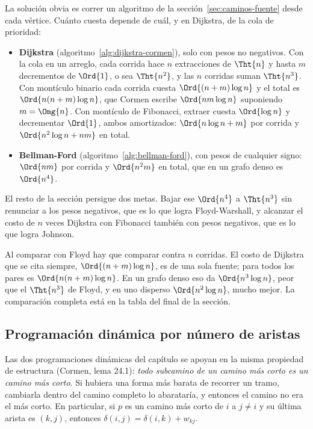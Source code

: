 \documentclass[11pt,letterpaper]{article}
\begin{document}
La solución obvia es correr un algoritmo de la
sección~\ref{sec:caminos-fuente} desde cada vértice. Cuánto cuesta
depende de cuál, y en Dijkstra, de la cola de prioridad:
\begin{itemize}[itemsep=0.1em]
  \item \textbf{Dijkstra} (algoritmo~\ref{alg:dijkstra-cormen}), solo
        con pesos no negativos. Con la cola en un arreglo, cada
        corrida hace $n$ extracciones de $\Tht{n}$ y hasta $m$
        decrementos de $\Ord{1}$, o sea $\Tht{n^2}$, y las $n$
        corridas suman $\Tht{n^3}$. Con montículo binario cada corrida
        cuesta $\Ord{(n + m)\log n}$ y el total es
        $\Ord{n(n + m)\log n}$, que Cormen escribe $\Ord{nm \log n}$
        suponiendo $m = \Omg{n}$. Con montículo de Fibonacci, extraer
        cuesta $\Ord{\log n}$ y decrementar $\Ord{1}$, ambos
        amortizados: $\Ord{n \log n + m}$ por corrida y
        $\Ord{n^2 \log n + nm}$ en total.
  \item \textbf{Bellman-Ford} (algoritmo~\ref{alg:bellman-ford}), con
        pesos de cualquier signo: $\Ord{nm}$ por corrida y
        $\Ord{n^2 m}$ en total, que en un grafo denso es $\Ord{n^4}$.
\end{itemize}
El resto de la sección persigue dos metas. Bajar ese $\Ord{n^4}$ a
$\Tht{n^3}$ sin renunciar a los pesos negativos, que es lo que logra
Floyd-Warshall, y alcanzar el costo de $n$ veces Dijkstra con
Fibonacci también con pesos negativos, que es lo que logra Johnson.

\begin{ojo}
  Al comparar con Floyd hay que comparar contra $n$ corridas. El costo
  de Dijkstra que se cita siempre, $\Ord{(n + m)\log n}$, es de una
  sola fuente; para todos los pares es $\Ord{n(n + m)\log n}$. En un
  grafo denso eso da $\Ord{n^3 \log n}$, peor que el $\Tht{n^3}$ de
  Floyd, y en uno disperso $\Ord{n^2 \log n}$, mucho mejor. La
  comparación completa está en la tabla del final de la sección.
\end{ojo}


\subsection*{Programación dinámica por número de aristas}

Las dos programaciones dinámicas del capítulo se apoyan en la misma
propiedad de estructura (Cormen, lema 24.1): \emph{todo subcamino de
un camino más corto es un camino más corto}. Si hubiera una forma más
barata de recorrer un tramo, cambiarla dentro del camino completo lo
abarataría, y entonces el camino no era el más corto. En particular,
si $p$ es un camino más corto de $i$ a $j \neq i$ y su última arista
es $(k, j)$, entonces $\delta(i, j) = \delta(i, k) + w_{kj}$.
\end{document}
